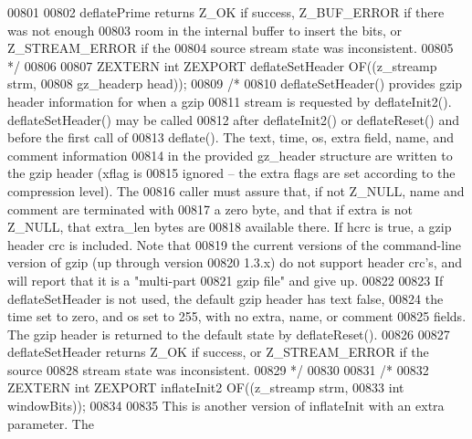 \begin{DoxyCode}
00801 \textcolor{comment}{}
00802 \textcolor{comment}{     deflatePrime returns Z\_OK if success, Z\_BUF\_ERROR if there was not enough}
00803 \textcolor{comment}{   room in the internal buffer to insert the bits, or Z\_STREAM\_ERROR if the}
00804 \textcolor{comment}{   source stream state was inconsistent.}
00805 \textcolor{comment}{*/}
00806 
00807 ZEXTERN \textcolor{keywordtype}{int} ZEXPORT deflateSetHeader OF((z\_streamp strm,
00808                                          gz\_headerp head));
00809 \textcolor{comment}{/*}
00810 \textcolor{comment}{     deflateSetHeader() provides gzip header information for when a gzip}
00811 \textcolor{comment}{   stream is requested by deflateInit2().  deflateSetHeader() may be called}
00812 \textcolor{comment}{   after deflateInit2() or deflateReset() and before the first call of}
00813 \textcolor{comment}{   deflate().  The text, time, os, extra field, name, and comment information}
00814 \textcolor{comment}{   in the provided gz\_header structure are written to the gzip header (xflag is}
00815 \textcolor{comment}{   ignored -- the extra flags are set according to the compression level).  The}
00816 \textcolor{comment}{   caller must assure that, if not Z\_NULL, name and comment are terminated with}
00817 \textcolor{comment}{   a zero byte, and that if extra is not Z\_NULL, that extra\_len bytes are}
00818 \textcolor{comment}{   available there.  If hcrc is true, a gzip header crc is included.  Note that}
00819 \textcolor{comment}{   the current versions of the command-line version of gzip (up through version}
00820 \textcolor{comment}{   1.3.x) do not support header crc's, and will report that it is a "multi-part}
00821 \textcolor{comment}{   gzip file" and give up.}
00822 \textcolor{comment}{}
00823 \textcolor{comment}{     If deflateSetHeader is not used, the default gzip header has text false,}
00824 \textcolor{comment}{   the time set to zero, and os set to 255, with no extra, name, or comment}
00825 \textcolor{comment}{   fields.  The gzip header is returned to the default state by deflateReset().}
00826 \textcolor{comment}{}
00827 \textcolor{comment}{     deflateSetHeader returns Z\_OK if success, or Z\_STREAM\_ERROR if the source}
00828 \textcolor{comment}{   stream state was inconsistent.}
00829 \textcolor{comment}{*/}
00830 
00831 \textcolor{comment}{/*}
00832 \textcolor{comment}{ZEXTERN int ZEXPORT inflateInit2 OF((z\_streamp strm,}
00833 \textcolor{comment}{                                     int  windowBits));}
00834 \textcolor{comment}{}
00835 \textcolor{comment}{     This is another version of inflateInit with an extra parameter.  The}

\end{DoxyCode}
